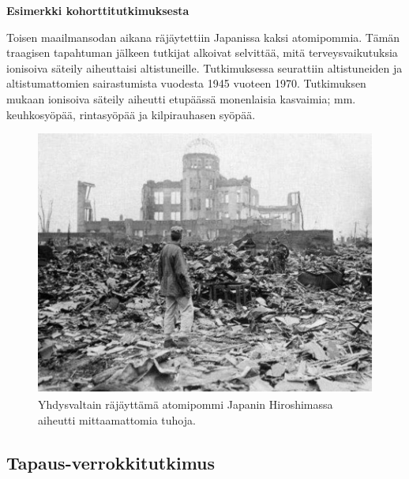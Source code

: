 \documentclass[
]{book}
\begin{document}
\begin{eblock}{}
\textbf{Esimerkki kohorttitutkimuksesta}

Toisen maailmansodan aikana räjäytettiin Japanissa kaksi atomipommia. Tämän traagisen tapahtuman jälkeen tutkijat alkoivat selvittää, mitä terveysvaikutuksia ionisoiva säteily aiheuttaisi altistuneille. Tutkimuksessa seurattiin altistuneiden ja altistumattomien sairastumista vuodesta 1945 vuoteen 1970. Tutkimuksen mukaan ionisoiva säteily aiheutti etupäässä monenlaisia kasvaimia; mm. keuhkosyöpää, rintasyöpää ja kilpirauhasen syöpää.

\end{eblock}

\begin{figure}

{\centering \includegraphics[width=1\linewidth]{images/hiroshima} 

}

\caption{Yhdysvaltain räjäyttämä atomipommi Japanin Hiroshimassa aiheutti mittaamattomia tuhoja.}\label{fig:hiroshima}
\end{figure}

\hfill\break

\hypertarget{tapaus-verrokkitutkimus}{%
\subsection{\texorpdfstring{\textbf{Tapaus-verrokkitutkimus}}{Tapaus-verrokkitutkimus}}\label{tapaus-verrokkitutkimus}}
\end{document}
